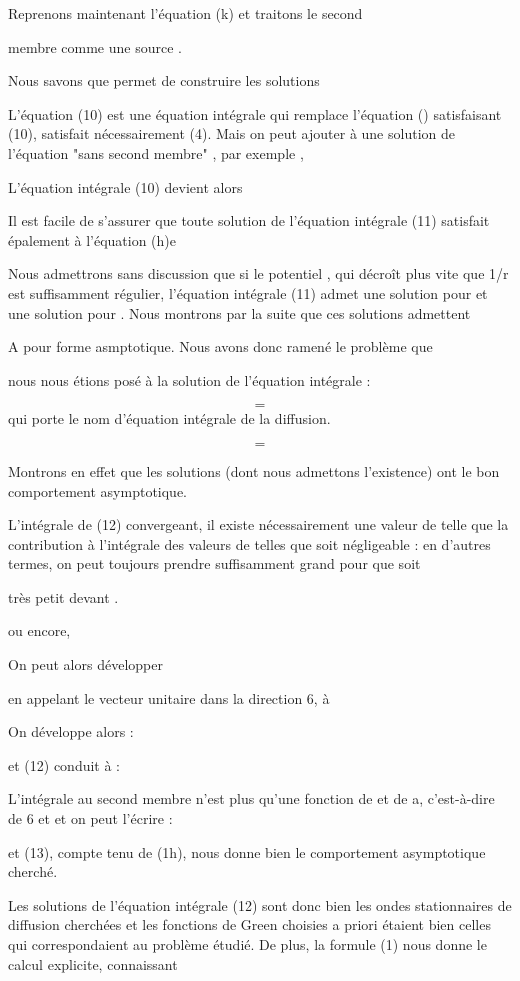 Reprenons maintenant l'équation (k) et traitons le second

membre  comme une source .

Nous savons que  permet de construire les solutions

L'équation (10) est une équation intégrale qui remplace
l'équation ()  satisfaisant (10), satisfait nécessairement (4).
Mais on peut ajouter à  une solution de l'équation "sans second
membre" , par exemple ,

L'équation intégrale (10) devient alors

Il est facile de s'assurer que toute solution de l'équation
intégrale (11) satisfait épalement à l'équation (h)e

Nous admettrons sans discussion que si le potentiel ,
qui décroît plus vite que 1/r est suffisamment régulier, l'équation intégrale (11)
admet une solution pour  et une solution pour
. Nous montrons par la suite que ces solutions admettent

A  pour forme asmptotique. Nous avons donc ramené le problème que

nous nous étions posé à la solution de l'équation intégrale :

\[
\tag{12}=
\]
qui porte le nom d'équation intégrale de la diffusion.

\[
\tag{4}=
\]


Montrons en effet que les solutions  (dont nous
admettons l'existence) ont le bon comportement asymptotique.

L'intégrale de (12) convergeant, il existe nécessairement
une valeur de  telle que la contribution à l'intégrale des valeurs
de telles que  soit négligeable : en d'autres termes,
on peut toujours prendre  suffisamment grand pour que  soit

très petit devant .

 ou encore,

On peut alors développer 

en appelant  le vecteur unitaire dans la direction 6, à 

On développe alors :

et (12) conduit à :

L'intégrale au second membre n'est plus qu'une fonction de  et de a,
c'est-à-dire de 6 et  et on peut l'écrire :

et (13), compte tenu de (1h), nous donne bien le comportement asymptotique
cherché.

Les solutions de l'équation intégrale (12) sont donc bien
les ondes stationnaires de diffusion cherchées et les fonctions de Green
choisies a priori étaient bien celles qui correspondaient au problème
étudié. De plus, la formule (1) nous donne le calcul explicite, connaissant

